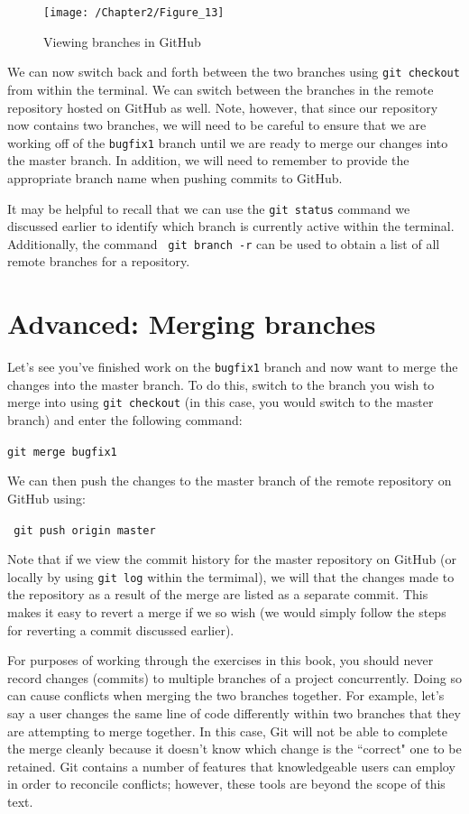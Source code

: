 \documentclass{book}
\begin{document}
\begin{figure}[h]
	\caption{Viewing branches in GitHub}
	\centering\texttt{[image: /Chapter2/Figure\_13]}
\end{figure}

We can now switch back and forth between the two branches using \texttt{git checkout} from within the terminal. We can switch between the branches in the remote repository hosted on GitHub as well. Note, however, that since our repository now contains two branches, we will need to be careful to ensure that we are working off of the \texttt{bugfix1} branch until we are ready to merge our changes into the master branch. In addition, we will need to remember to provide the appropriate branch name when pushing commits to GitHub.

It may be helpful to recall that we can use the \texttt{git status} command we discussed earlier to identify which branch is currently active within the terminal. Additionally, the command \texttt{ git branch -r} can be used to obtain a list of all remote branches for a repository.

\section{Advanced: Merging branches}

Let's see you've finished work on the \texttt{bugfix1} branch and now want to merge the changes into the master branch. To do this, switch to the branch you wish to merge into using \texttt{git checkout} (in this case, you would switch to the master branch) and enter the following command:

\texttt{git merge bugfix1}

We can then push the changes to the master branch of the remote repository on GitHub using:

\texttt{ git push origin master}

Note that if we view the commit history for the master repository on GitHub (or locally by using \texttt{git log} within the termimal), we will that the changes made to the repository as a result of the merge are listed as a separate commit. This makes it easy to revert a merge if we so wish (we would simply follow the steps for reverting a commit discussed earlier).

For purposes of working through the exercises in this book, you should never record changes (commits) to multiple branches of a project concurrently. Doing so can cause conflicts when merging the two branches together. For example, let's say a user changes the same line of code differently within two branches that they are attempting to merge together. In this case, Git will not be able to complete the merge cleanly because it doesn't know which change is the ``correct" one to be retained. Git contains a number of features that knowledgeable users can employ in order to reconcile conflicts; however, these tools are beyond the scope of this text.
\end{document}
